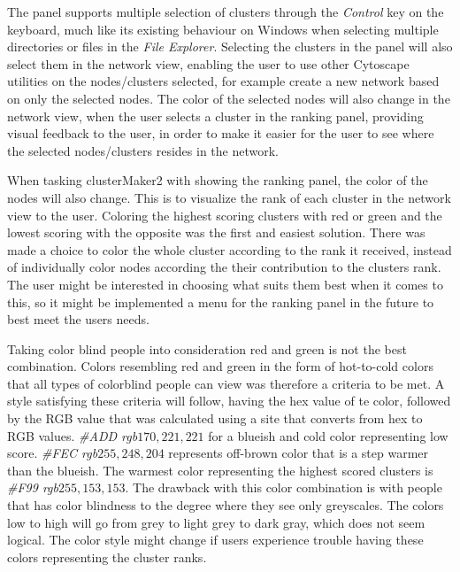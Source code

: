 The panel supports multiple selection of clusters through the \textit{Control}
key on the keyboard, much like its existing behaviour on Windows when selecting
multiple directories or files in the \textit{File Explorer}. Selecting the
clusters in the panel will also select them in the network view, enabling the
user to use other Cytoscape utilities on the nodes/clusters selected, for
example create a new network based on only the selected nodes. The color of the
selected nodes will also change in the network view, when the user selects a
cluster in the ranking panel, providing visual feedback to the user, in order to
make it easier for the user to see where the selected nodes/clusters resides in
the network.

When tasking clusterMaker2 with showing the ranking panel, the color of the
nodes will also change. This is to visualize the rank of each cluster in the
network view to the user. Coloring the highest scoring clusters with red or
green and the lowest scoring with the opposite was the first and easiest
solution. There was made a choice to color the whole cluster according to the
rank it received, instead of individually color nodes according the their
contribution to the clusters rank. The user might be interested in choosing what
suits them best when it comes to this, so it might be implemented a menu for the
ranking panel in the future to best meet the users needs.

Taking color blind people into consideration red and green is not the
best combination. Colors resembling red and green in the form of hot-to-cold
colors that all types of colorblind people can view was therefore a criteria to
be met. A style satisfying these criteria will follow, having the hex value of
te color\cite{color-blindness3}, followed by the RGB value that was calculated
using a site that converts from hex to RGB values\cite{color-blindness2}.
\textit{\#ADD rgb\(170,221,221\)} for a blueish and cold color representing low
score. \textit{\#FEC rgb\(255,248,204\)} represents off-brown color that is a
step warmer than the blueish. The warmest color representing the highest scored
clusters is \textit{\#F99 rgb\(255,153,153\)}. The drawback with this color
combination is with people that has color blindness to the degree where they see
only greyscales. The colors low to high will go from grey to light grey to dark
gray, which does not seem logical. The color style might change if users
experience trouble having these colors representing the cluster ranks. 

